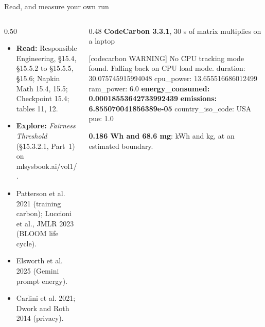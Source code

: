 \documentclass[aspectratio=169, 12pt]{beamer}
\begin{document}
\begin{frame}[fragile]{Read, and measure your own run}
  \begin{columns}[T]
    \begin{column}{0.50\textwidth}
      \footnotesize
      \begin{itemize}\setlength{\itemsep}{0.03cm}
        \item \textbf{Read:} Responsible Engineering, \S15.4, \S15.5.2 to \S15.5.5, \S15.6; Napkin Math 15.4, 15.5; Checkpoint 15.4; tables 11, 12.
        \item \textbf{Explore:} \emph{Fairness Threshold} (\S15.3.2.1, Part~1) on mlsysbook.ai/vol1/.
        \item Patterson et al. 2021 (training carbon); Luccioni et al., JMLR 2023 (BLOOM life cycle).
        \item Elsworth et al. 2025 (Gemini prompt energy).
        \item Carlini et al. 2021; Dwork and Roth 2014 (privacy).
      \end{itemize}
    \end{column}
    \begin{column}{0.48\textwidth}
      {\footnotesize\textbf{CodeCarbon 3.3.1}, 30 s of matrix multiplies on a laptop}
\vspace{-0.1cm}
\begin{semiverbatim}\fontsize{7.6}{8.9}\selectfont
\textcolor{RedLine}{[codecarbon WARNING] No CPU tracking}
\textcolor{RedLine}{ mode found. Falling back on CPU load mode.}
duration: 30.075745915994048
cpu_power: 13.655516686012499
ram_power: 6.0
\textcolor{mlsysaccent}{\textbf{energy_consumed: 0.00018553642733992439}}
\textcolor{mlsysaccent}{\textbf{emissions: 6.855070041856389e-05}}
country_iso_code: USA
pue: 1.0
\end{semiverbatim}
      {\small\textcolor{mlsysaccent}{\textbf{0.186 Wh and 68.6 mg}}: kWh and kg, at an estimated boundary.}
    \end{column}
  \end{columns}
\end{frame}
\end{document}
